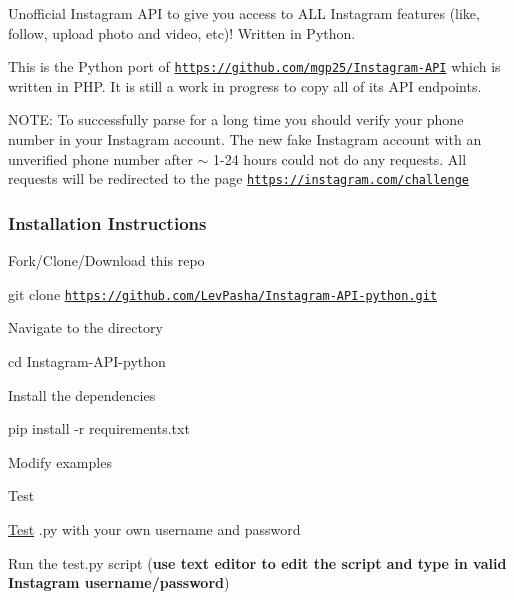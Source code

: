 \href{https://www.paypal.com/cgi-bin/webscr?cmd=_donations&business=7BMM6JGE73322&lc=US&item_name=GitHub%20donation&currency_code=USD&bn=PP%2dDonationsBF%3abtn_donate_SM%2egif%3aNonHosted}{\tt } \href{https://github.com/LevPasha/Instagram-bot-cs}{\tt } \href{https://github.com/LevPasha/instabot.py}{\tt } \href{http://isdb.pw}{\tt }

Unofficial Instagram A\+PI to give you access to A\+LL Instagram features (like, follow, upload photo and video, etc)! Written in Python.

This is the Python port of \href{https://github.com/mgp25/Instagram-API}{\tt https\+://github.\+com/mgp25/\+Instagram-\/\+A\+PI} which is written in P\+HP. It is still a work in progress to copy all of its A\+PI endpoints.

N\+O\+TE\+: To successfully parse for a long time you should verify your phone number in your Instagram account. The new fake Instagram account with an unverified phone number after $\sim$ 1-\/24 hours could not do any requests. All requests will be redirected to the page \href{https://instagram.com/challenge}{\tt https\+://instagram.\+com/challenge}

\subsubsection*{Installation Instructions}


\begin{DoxyEnumerate}
\item Fork/\+Clone/\+Download this repo

{\ttfamily git clone \href{https://github.com/LevPasha/Instagram-API-python.git}{\tt https\+://github.\+com/\+Lev\+Pasha/\+Instagram-\/\+A\+P\+I-\/python.\+git}}
\item Navigate to the directory

{\ttfamily cd Instagram-\/\+A\+P\+I-\/python}
\item Install the dependencies

{\ttfamily pip install -\/r requirements.\+txt}
\item Modify examples\begin{DoxyRefDesc}{Test}
\item[\mbox{\hyperlink{test__test000001}{Test}}].py with your own username and password\end{DoxyRefDesc}

\item Run the test.\+py script ({\bfseries use text editor to edit the script and type in valid Instagram username/password})
\end{DoxyEnumerate}

